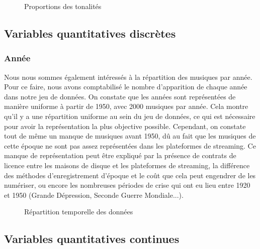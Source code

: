 \documentclass[a4paper, 12pt]{report}
\begin{document}
\begin{figure}[!h]
    \centering
    
    \caption{Proportions des tonalités}
\end{figure}

\subsection{Variables quantitatives discrètes}

\subsubsection{Année}

Nous nous sommes également intéressés à la répartition des musiques par année. Pour ce faire, nous avons comptabilisé le nombre d'apparition de chaque année dans notre jeu de données. On constate que les années sont représentées de manière uniforme à partir de 1950, avec 2000 musiques par année. Cela montre qu'il y a une répartition uniforme au sein du jeu de données, ce qui est nécessaire pour avoir la représentation la plus objective possible. Cependant, on constate tout de même un manque de musiques avant 1950, dû au fait que les musiques de cette époque ne sont pas assez représentées dans les plateformes de streaming. Ce manque de représentation peut être expliqué par la présence de contrats de licence entre les maisons de disque et les plateformes de streaming, la différence des méthodes d'enregistrement d'époque et le coût que cela peut engendrer de les numériser, ou encore les nombreuses périodes de crise qui ont eu lieu entre 1920 et 1950 (Grande Dépression, Seconde Guerre Mondiale...).

\begin{figure}[!h]
    \centering

    \caption{Répartition temporelle des données}
\end{figure}

\subsection{Variables quantitatives continues}
\end{document}
